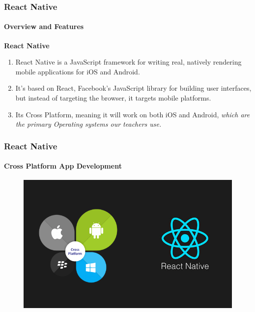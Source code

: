 \documentclass[aspectratio=169]{beamer}
\begin{document}
\begin{frame}
	\centering
	\frametitle{React Native}
	\framesubtitle{Overview and Features}
	\begin{minipage}{0.95\textwidth}
		\textbf{React Native}
		\begin{enumerate}
			\item React Native is a JavaScript framework for writing real, natively rendering mobile applications for iOS and Android.
			\item It’s based on React, Facebook’s JavaScript library for building user interfaces, but instead of targeting the browser, it targets mobile platforms.
			\item Its Cross Platform, meaning it will work on both iOS and Android, \textit{which are the primary Operating systems our teachers use.}
		\end{enumerate}
	\end{minipage}
\end{frame}


\begin{frame}
	\centering
	\frametitle{React Native}
	\framesubtitle{Cross Platform App Development}
	\begin{minipage}{0.95\textwidth}
		\begin{figure}[H]
			\centering
			\includegraphics[width=.85\textwidth]{react native 2.png}
		\end{figure}
	\end{minipage}
\end{frame}
\end{document}
